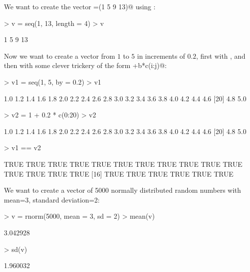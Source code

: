 \documentclass[11pt, oneside, reqno]{article}
\begin{document}

We want to create the vector \verb@v=(1 5 9 13)@ using \verb@seq@:
\begin{Schunk}
\begin{Sinput}
> v = seq(1, 13, length = 4)
> v
\end{Sinput}
\begin{Soutput}
[1]  1  5  9 13
\end{Soutput}
\end{Schunk}

Now we want to create a vector from $1$ to $5$ in increments of $0.2$, first with \verb@seq@, and then with some clever trickery of the form +b*c(i:j)@:

\begin{Schunk}
\begin{Sinput}
> v1 = seq(1, 5, by = 0.2)
> v1
\end{Sinput}
\begin{Soutput}
 [1] 1.0 1.2 1.4 1.6 1.8 2.0 2.2 2.4 2.6 2.8 3.0 3.2 3.4 3.6 3.8 4.0 4.2 4.4 4.6
[20] 4.8 5.0
\end{Soutput}
\begin{Sinput}
> v2 = 1 + 0.2 * c(0:20)
> v2
\end{Sinput}
\begin{Soutput}
 [1] 1.0 1.2 1.4 1.6 1.8 2.0 2.2 2.4 2.6 2.8 3.0 3.2 3.4 3.6 3.8 4.0 4.2 4.4 4.6
[20] 4.8 5.0
\end{Soutput}
\begin{Sinput}
> v1 == v2
\end{Sinput}
\begin{Soutput}
 [1] TRUE TRUE TRUE TRUE TRUE TRUE TRUE TRUE TRUE TRUE TRUE TRUE TRUE TRUE TRUE
[16] TRUE TRUE TRUE TRUE TRUE TRUE
\end{Soutput}
\end{Schunk}
\eans

We want to create a vector of 5000 normally distributed random numbers with mean=3, standard deviation=2:

\begin{Schunk}
\begin{Sinput}
> v = rnorm(5000, mean = 3, sd = 2)
> mean(v)
\end{Sinput}
\begin{Soutput}
[1] 3.042928
\end{Soutput}
\begin{Sinput}
> sd(v)
\end{Sinput}
\begin{Soutput}
[1] 1.960032
\end{Soutput}
\end{Schunk}
\end{document}
